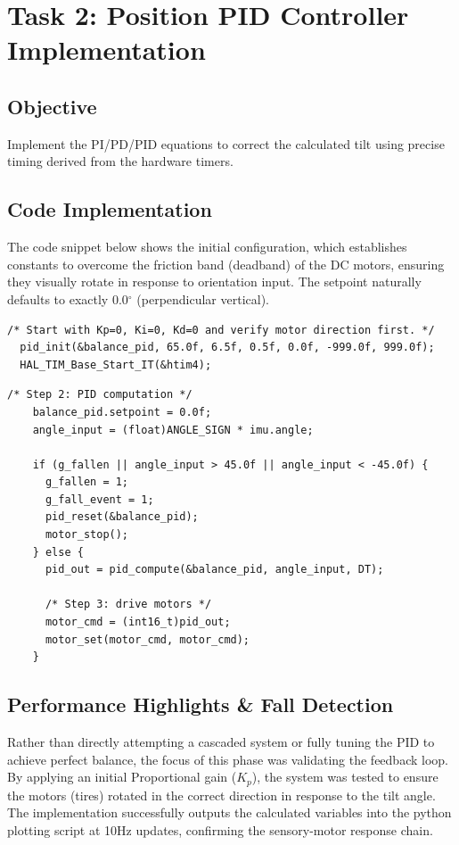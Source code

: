\documentclass[12pt,a4paper]{article}
\begin{document}
\section{Task 2: Position PID Controller Implementation}

\subsection{Objective}
Implement the PI/PD/PID equations to correct the calculated tilt using precise timing derived from the hardware timers.

\subsection{Code Implementation}

The code snippet below shows the initial configuration, which establishes constants to overcome the friction band (deadband) of the DC motors, ensuring they visually rotate in response to orientation input. The setpoint naturally defaults to exactly 0.0$^\circ$ (perpendicular vertical).

\begin{lstlisting}[caption=PID Initialization (`main.c`)]
  /* Start with Kp=0, Ki=0, Kd=0 and verify motor direction first. */
  pid_init(&balance_pid, 65.0f, 6.5f, 0.5f, 0.0f, -999.0f, 999.0f);
  HAL_TIM_Base_Start_IT(&htim4);
\end{lstlisting}

\begin{lstlisting}[caption=PID Update execution within TIM4 loop (`main.c`)]
    /* Step 2: PID computation */
    balance_pid.setpoint = 0.0f;
    angle_input = (float)ANGLE_SIGN * imu.angle;

    if (g_fallen || angle_input > 45.0f || angle_input < -45.0f) {
      g_fallen = 1;
      g_fall_event = 1;
      pid_reset(&balance_pid);
      motor_stop();
    } else {
      pid_out = pid_compute(&balance_pid, angle_input, DT);

      /* Step 3: drive motors */
      motor_cmd = (int16_t)pid_out;
      motor_set(motor_cmd, motor_cmd);
    }
\end{lstlisting}

\subsection{Performance Highlights \& Fall Detection}

Rather than directly attempting a cascaded system or fully tuning the PID to achieve perfect balance, the focus of this phase was validating the feedback loop. By applying an initial Proportional gain ($K_p$), the system was tested to ensure the motors (tires) rotated in the correct direction in response to the tilt angle. The implementation successfully outputs the calculated variables into the python plotting script at 10Hz updates, confirming the sensory-motor response chain.
\end{document}
